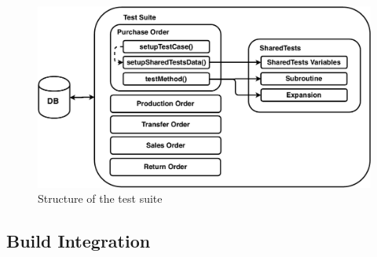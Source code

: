 \begin{figure}[ht]
	\centering
	\includegraphics[scale=0.6]{Images/TestSuite.pdf}
	\caption{Structure of the test suite}
	\label{fig:TestSuite}
\end{figure}

\subsection{Build Integration}

